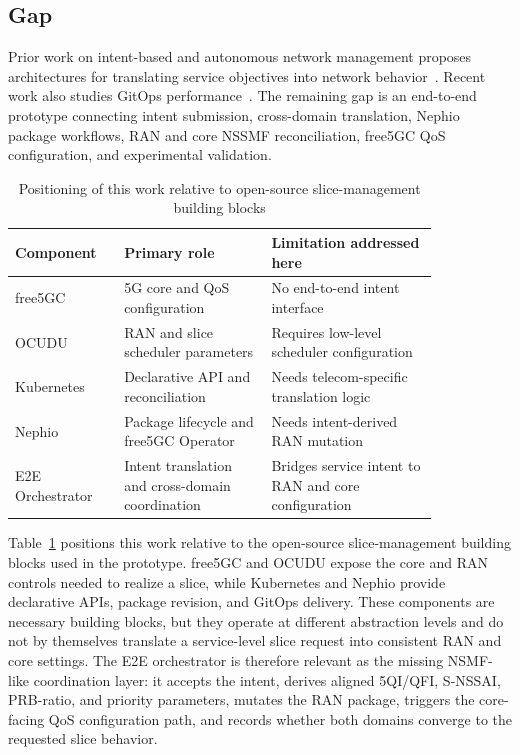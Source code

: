 \subsection{Gap}

Prior work on intent-based and autonomous network management proposes architectures for translating service objectives into network behavior~\cite{chirivella2023e2e,martini2023intent,tran2024ina,antonakoglou2025camino,nahum2025intent}. Recent work also studies GitOps performance~\cite{ghosh2025performance}. The remaining gap is an end-to-end prototype connecting intent submission, cross-domain translation, Nephio package workflows, RAN and core NSSMF reconciliation, free5GC QoS configuration, and experimental validation.

\begin{table}[t]
  \caption{Positioning of this work relative to open-source slice-management building blocks}
  \label{tab:positioning}
  \begin{tabular}{p{0.20\linewidth}p{0.30\linewidth}p{0.34\linewidth}}
    \toprule
    Component & Primary role & Limitation addressed here \\
    \midrule
    free5GC & 5G core and QoS configuration & No end-to-end intent interface \\
    OCUDU & RAN and slice scheduler parameters & Requires low-level scheduler configuration \\
    Kubernetes & Declarative API and reconciliation & Needs telecom-specific translation logic \\
    Nephio & Package lifecycle and free5GC Operator & Needs intent-derived RAN mutation \\
    E2E Orchestrator & Intent translation and cross-domain coordination & Bridges service intent to RAN and core configuration \\
    \bottomrule
  \end{tabular}
\end{table}

Table~\ref{tab:positioning} positions this work relative to the open-source slice-management building blocks used in the prototype. free5GC and OCUDU expose the core and RAN controls needed to realize a slice, while Kubernetes and Nephio provide declarative APIs, package revision, and GitOps delivery. These components are necessary building blocks, but they operate at different abstraction levels and do not by themselves translate a service-level slice request into consistent RAN and core settings. The E2E orchestrator is therefore relevant as the missing NSMF-like coordination layer: it accepts the intent, derives aligned 5QI/QFI, S-NSSAI, PRB-ratio, and priority parameters, mutates the RAN package, triggers the core-facing QoS configuration path, and records whether both domains converge to the requested slice behavior.
